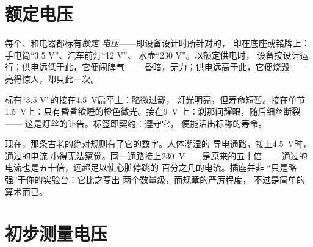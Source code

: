 \section{额定电压}

\begin{definition}[额定电压]\label{def:g8:voltage-voltmeter:nominal}
每个、和电器都标有\emph{额定
电压}——即设备设计时所针对的，
印在底座或铭牌上：手电筒“3.5 V”、汽车前灯“12 V”、
水壶“230 V”。以额定供电时，
设备按设计运行；供电远低于此，它便闹脾气——
昏暗，无力；供电远高于此，它便烧毁——
亮得惊人，却只此一次。
\end{definition}

\begin{example}[灯泡与电池的匹配]\label{ex:g8:voltage-voltmeter:matching}
标有“3.5 V”的接在\qty{4.5}{V}扁平上：略微过载，
灯光明亮，但寿命短暂。接在单节
\qty{1.5}{V}上：只有昏昏欲睡的橙色微光。接在\qty{9}{V}
上：刹那间耀眼，随后细丝断裂——
这是灯丝的讣告。标签即契约：遵守它，
便能活出标称的寿命。
\end{example}

\begin{remark}[为何 230 V 会致命]\label{rem:g8:voltage-voltmeter:mains}
现在，那条古老的绝对规则有了它的数字。人体潮湿的
导电通路，接上\qty{4.5}{V}时，通过的电流
小得无法察觉。同一通路接上\qty{230}{V}——是原来的五十倍——
通过的电流也是五十倍，远超足以使心脏停跳的
百分之几的电流。插座并非
“只是略强”于你的实验台：它比之高出
两个数量级，而规章的严厉程度，
不过是简单的算术而已。
\end{remark}

\section{初步测量电压}

